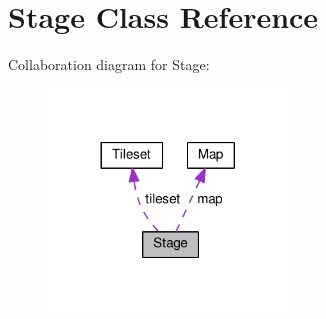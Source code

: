 \hypertarget{classStage}{}\section{Stage Class Reference}
\label{classStage}


Collaboration diagram for Stage\+:
\nopagebreak
\begin{figure}[H]
\begin{center}
\leavevmode
\includegraphics[width=180pt]{classStage__coll__graph}
\end{center}
\end{figure}
